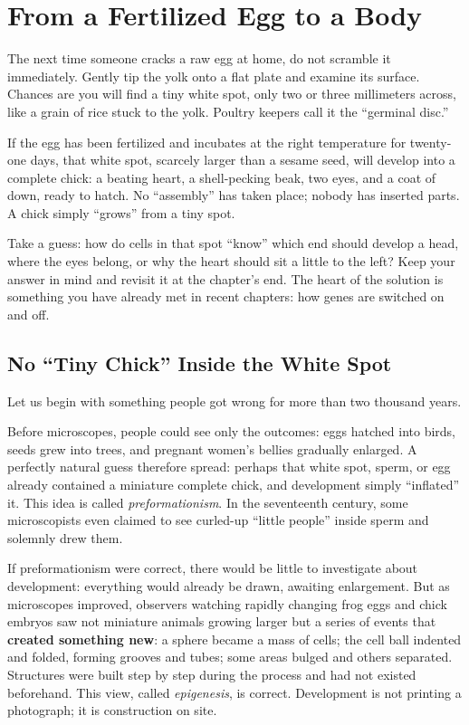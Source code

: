 \chapter{From a Fertilized Egg to a Body}

\begin{kaichang}
The next time someone cracks a raw egg at home, do not scramble it immediately. Gently tip the yolk onto a flat plate and examine its surface. Chances are you will find a tiny white spot, only two or three millimeters across, like a grain of rice stuck to the yolk. Poultry keepers call it the ``germinal disc.''

If the egg has been fertilized and incubates at the right temperature for twenty-one days, that white spot, scarcely larger than a sesame seed, will develop into a complete chick: a beating heart, a shell-pecking beak, two eyes, and a coat of down, ready to hatch. No ``assembly'' has taken place; nobody has inserted parts. A chick simply ``grows'' from a tiny spot.

Take a guess: how do cells in that spot ``know'' which end should develop a head, where the eyes belong, or why the heart should sit a little to the left? Keep your answer in mind and revisit it at the chapter's end. The heart of the solution is something you have already met in recent chapters: how genes are switched on and off.
\end{kaichang}

\section{No ``Tiny Chick'' Inside the White Spot}

Let us begin with something people got wrong for more than two thousand years.

Before microscopes, people could see only the outcomes: eggs hatched into birds, seeds grew into trees, and pregnant women's bellies gradually enlarged. A perfectly natural guess therefore spread: perhaps that white spot, sperm, or egg already contained a miniature complete chick, and development simply ``inflated'' it. This idea is called \emph{preformationism}. In the seventeenth century, some microscopists even claimed to see curled-up ``little people'' inside sperm and solemnly drew them.

If preformationism were correct, there would be little to investigate about development: everything would already be drawn, awaiting enlargement. But as microscopes improved, observers watching rapidly changing frog eggs and chick embryos saw not miniature animals growing larger but a series of events that \textbf{created something new}: a sphere became a mass of cells; the cell ball indented and folded, forming grooves and tubes; some areas bulged and others separated. Structures were built step by step during the process and had not existed beforehand. This view, called \emph{epigenesis}, is correct. Development is not printing a photograph; it is construction on site.

